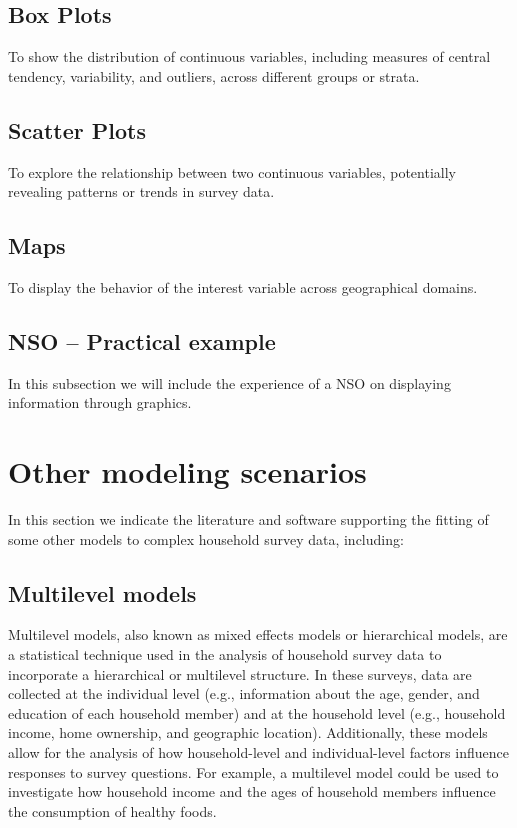 \documentclass[
  12pt,
]{book}
\begin{document}
\hypertarget{box-plots}{%
\section{Box Plots}\label{box-plots}}

To show the distribution of continuous variables, including measures of central tendency, variability, and outliers, across different groups or strata.

\hypertarget{scatter-plots}{%
\section{Scatter Plots}\label{scatter-plots}}

To explore the relationship between two continuous variables, potentially revealing patterns or trends in survey data.

\hypertarget{maps}{%
\section{Maps}\label{maps}}

To display the behavior of the interest variable across geographical domains.

\hypertarget{nso-practical-example-3}{%
\section{NSO -- Practical example}\label{nso-practical-example-3}}

In this subsection we will include the experience of a NSO on displaying information through graphics.

\hypertarget{other-modeling-scenarios}{%
\chapter{Other modeling scenarios}\label{other-modeling-scenarios}}

In this section we indicate the literature and software supporting the fitting of some other models to complex household survey data, including:

\hypertarget{multilevel-models}{%
\section{Multilevel models}\label{multilevel-models}}

Multilevel models, also known as mixed effects models or hierarchical models, are a statistical technique used in the analysis of household survey data to incorporate a hierarchical or multilevel structure. In these surveys, data are collected at the individual level (e.g., information about the age, gender, and education of each household member) and at the household level (e.g., household income, home ownership, and geographic location). Additionally, these models allow for the analysis of how household-level and individual-level factors influence responses to survey questions. For example, a multilevel model could be used to investigate how household income and the ages of household members influence the consumption of healthy foods.
\end{document}
